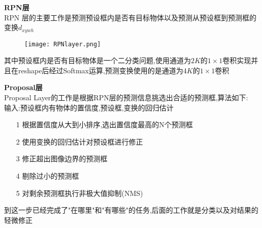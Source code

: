 \begin{frame}
    \vspace{0.5em}
    \noindent\large\textbf{RPN层}\\
    \vspace{0.5em}
    RPN 层的主要工作是预测预设框内是否有目标物体以及预测从预设框到预测框的变换$d_{xywh}$
    \begin{figure}
        \texttt{[image: RPNlayer.png]}
    \end{figure}
    其中预设框内是否有目标物体是一个二分类问题,使用通道为$2K$的$1\times 1$卷积实现并且在reshape后经过Softmax运算,预测变换使用的是通道为$4K$的$1\times 1$卷积


\end{frame}

\begin{frame}
    \vspace{0.5em}
    \noindent\large\textbf{Proposal层}\\
    \vspace{0.5em}
    Proposal Layer的工作是根据RPN层的预测信息挑选出合适的预测框,算法如下:\\
    \vspace{0.2em}
    输入:预设框内有物体的置信度,预设框,变换的回归估计
    \vspace{0.2em}
    \begin{itemize}
        \item[1]根据置信度从大到小排序,选出置信度最高的N个预测框
        \item[2]使用变换的回归估计对预设框进行修正
        \item[3]修正超出图像边界的预测框
        \item[4]剔除过小的预测框
        \item[5]对剩余预测框执行非极大值抑制(NMS)
    \end{itemize}
    \vspace{0.5em}
    到这一步已经完成了"在哪里"和"有哪些"的任务,后面的工作就是分类以及对结果的轻微修正
\end{frame}

